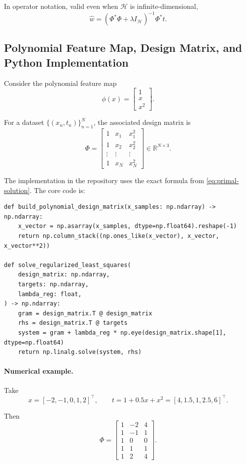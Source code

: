 \documentclass[11pt]{article}
\newcommand{\R}{\mathbb{R}}
\newcommand{\Hspace}{\mathcal{H}}
\newcommand{\transpose}{^{\top}}
\begin{document}
In operator notation, valid even when $\Hspace$ is infinite-dimensional,
\[
\widehat{w}
=
(\Phi^\ast \Phi + \lambda I_{\Hspace})^{-1}\Phi^\ast t.
\]

\subsection{Polynomial Feature Map, Design Matrix, and Python Implementation}

Consider the polynomial feature map
\[
\phi(x)
=
\begin{bmatrix}
1 \\
x \\
x^2
\end{bmatrix}.
\]

For a dataset $\{(x_n, t_n)\}_{n=1}^N$, the associated design matrix is
\[
\Phi
=
\begin{bmatrix}
1 & x_1 & x_1^2 \\
1 & x_2 & x_2^2 \\
\vdots & \vdots & \vdots \\
1 & x_N & x_N^2
\end{bmatrix}
\in \R^{N \times 3}.
\]

The implementation in the repository uses the exact formula from \eqref{eq:primal-solution}. The core code is:

\begin{lstlisting}[style=pythonstyle]
def build_polynomial_design_matrix(x_samples: np.ndarray) -> np.ndarray:
    x_vector = np.asarray(x_samples, dtype=np.float64).reshape(-1)
    return np.column_stack((np.ones_like(x_vector), x_vector, x_vector**2))

def solve_regularized_least_squares(
    design_matrix: np.ndarray,
    targets: np.ndarray,
    lambda_reg: float,
) -> np.ndarray:
    gram = design_matrix.T @ design_matrix
    rhs = design_matrix.T @ targets
    system = gram + lambda_reg * np.eye(design_matrix.shape[1], dtype=np.float64)
    return np.linalg.solve(system, rhs)
\end{lstlisting}

\paragraph{Numerical example.}
Take
\[
x = [-2,-1,0,1,2]\transpose,
\qquad
t = 1 + 0.5x + x^2
= [4,1.5,1,2.5,6]\transpose.
\]

Then
\[
\Phi =
\begin{bmatrix}
1 & -2 & 4 \\
1 & -1 & 1 \\
1 & 0 & 0 \\
1 & 1 & 1 \\
1 & 2 & 4
\end{bmatrix}.
\]
\end{document}
